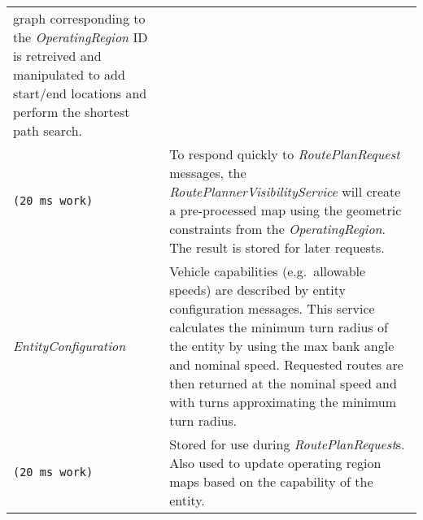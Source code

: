 \begin{longtable}[c]{@{}ll@{}}
\begin{minipage}[t]{0.65\columnwidth}
graph corresponding to the \emph{OperatingRegion} ID is retreived and
manipulated to add start/end locations and perform the shortest path
search.
\strut\end{minipage}\tabularnewline
\begin{minipage}[t]{0.29\columnwidth}\raggedright\strut
\begin{verbatim}
(20 ms work)
\end{verbatim}
\strut\end{minipage} &
\begin{minipage}[t]{0.65\columnwidth}\raggedright\strut
To respond quickly to \emph{RoutePlanRequest} messages, the
\emph{RoutePlannerVisibilityService} will create a pre-processed map
using the geometric constraints from the \emph{OperatingRegion}. The
result is stored for later requests.
\strut\end{minipage}\tabularnewline
\begin{minipage}[t]{0.29\columnwidth}\raggedright\strut
\emph{EntityConfiguration}
\strut\end{minipage} &
\begin{minipage}[t]{0.65\columnwidth}\raggedright\strut
Vehicle capabilities (e.g.~allowable speeds) are described by entity
configuration messages. This service calculates the minimum turn radius
of the entity by using the max bank angle and nominal speed. Requested
routes are then returned at the nominal speed and with turns
approximating the minimum turn radius.
\strut\end{minipage}\tabularnewline
\begin{minipage}[t]{0.29\columnwidth}\raggedright\strut
\begin{verbatim}
(20 ms work)
\end{verbatim}
\strut\end{minipage} &
\begin{minipage}[t]{0.65\columnwidth}\raggedright\strut
Stored for use during \emph{RoutePlanRequest}s. Also used to update
operating region maps based on the capability of the entity.
\strut\end{minipage}\tabularnewline
\bottomrule
\end{longtable}

